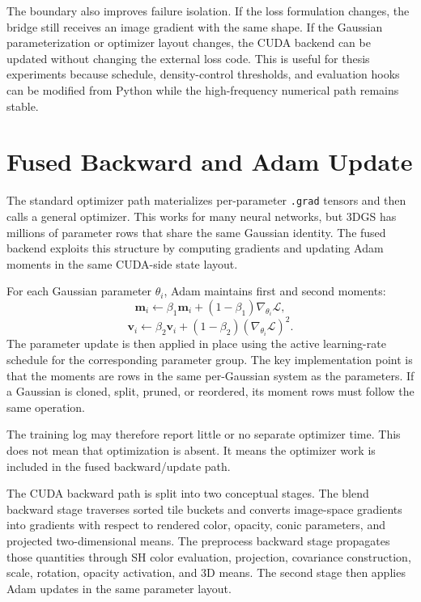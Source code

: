 The boundary also improves failure isolation. If the loss formulation changes, the bridge still receives an image gradient with the same shape. If the Gaussian parameterization or optimizer layout changes, the CUDA backend can be updated without changing the external loss code. This is useful for thesis experiments because schedule, density-control thresholds, and evaluation hooks can be modified from Python while the high-frequency numerical path remains stable.

\section{Fused Backward and Adam Update}

The standard optimizer path materializes per-parameter \texttt{.grad} tensors and then calls a general optimizer. This works for many neural networks, but 3DGS has millions of parameter rows that share the same Gaussian identity. The fused backend exploits this structure by computing gradients and updating Adam moments in the same CUDA-side state layout.

For each Gaussian parameter $\theta_i$, Adam maintains first and second moments:
\begin{equation}
\mathbf{m}_i \leftarrow \beta_1\mathbf{m}_i + (1-\beta_1)\nabla_{\theta_i}\mathcal{L},
\end{equation}
\begin{equation}
\mathbf{v}_i \leftarrow \beta_2\mathbf{v}_i + (1-\beta_2)(\nabla_{\theta_i}\mathcal{L})^2.
\end{equation}
The parameter update is then applied in place using the active learning-rate schedule for the corresponding parameter group. The key implementation point is that the moments are rows in the same per-Gaussian system as the parameters. If a Gaussian is cloned, split, pruned, or reordered, its moment rows must follow the same operation.

The training log may therefore report little or no separate optimizer time. This does not mean that optimization is absent. It means the optimizer work is included in the fused backward/update path.

The CUDA backward path is split into two conceptual stages. The blend backward stage traverses sorted tile buckets and converts image-space gradients into gradients with respect to rendered color, opacity, conic parameters, and projected two-dimensional means. The preprocess backward stage propagates those quantities through SH color evaluation, projection, covariance construction, scale, rotation, opacity activation, and 3D means. The second stage then applies Adam updates in the same parameter layout.

